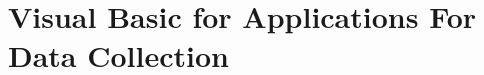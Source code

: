 \chapter{Visual Basic for Applications For Data Collection}
\label{AppendixAccessDatabase}
\clearpage



